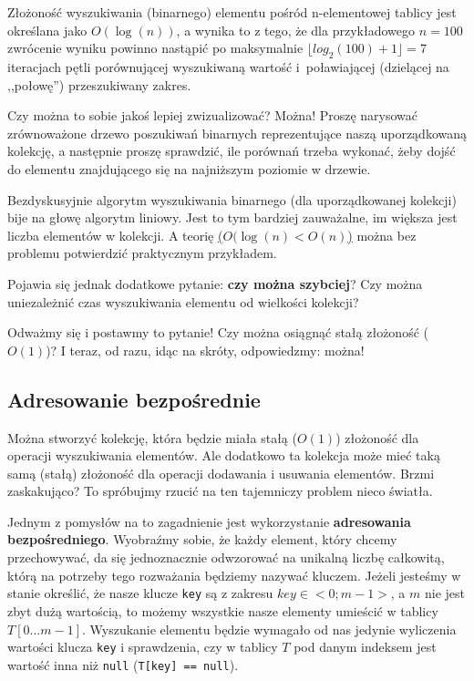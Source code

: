\documentclass[twoside]{article}
\begin{document}
Złożoność wyszukiwania (binarnego) elementu pośród n-elementowej tablicy jest określana jako
$O(\log(n))$, a wynika to z tego, że dla przykładowego $n=100$ zwrócenie wyniku powinno nastąpić
po maksymalnie $\lfloor log_2(100) + 1 \rfloor = 7$ iteracjach pętli porównującej wyszukiwaną
wartość i~poławiającej (dzielącej na ,,połowę'') przeszukiwany zakres.

Czy można to sobie jakoś lepiej zwizualizować? Można!
Proszę narysować zrównoważone drzewo poszukiwań binarnych reprezentujące naszą uporządkowaną kolekcję, a następnie proszę sprawdzić, ile porównań trzeba wykonać, żeby dojść do elementu
znajdującego się na najniższym poziomie w drzewie.

Bezdyskusyjnie algorytm wyszukiwania binarnego (dla uporządkowanej kolekcji) bije na głowę
algorytm liniowy. Jest to tym bardziej zauważalne, im większa jest liczba elementów w kolekcji.
A teorię \underline{($O(\log (n) < O(n)$)} można bez problemu potwierdzić praktycznym przykładem.

Pojawia się jednak dodatkowe pytanie: \textbf{czy można szybciej}?
Czy można uniezależnić czas wyszukiwania elementu od wielkości kolekcji?

Odważmy się i postawmy to pytanie! Czy można osiągnąć stałą złożoność ($O(1)$)?
I teraz, od razu, idąc na skróty, odpowiedzmy: można!

\subsection{Adresowanie bezpośrednie}
Można stworzyć kolekcję, która będzie miała stałą ($O(1)$) złożoność dla operacji wyszukiwania
elementów.
Ale dodatkowo ta kolekcja może mieć taką samą (stałą) złożoność dla operacji dodawania i usuwania
elementów.
Brzmi zaskakująco? To spróbujmy rzucić na ten tajemniczy problem nieco światła.

Jednym z pomysłów na to zagadnienie jest wykorzystanie \textbf{adresowania bezpośredniego}.
Wyobraźmy sobie, że każdy element, który chcemy przechowywać, da się jednoznacznie odwzorować na unikalną liczbę całkowitą, którą na potrzeby tego rozważania będziemy nazywać kluczem.
Jeżeli jesteśmy w stanie określić, że nasze klucze \verb|key| są z zakresu $key \in <0; m-1>$, 
a $m$ nie jest zbyt dużą wartością, to możemy wszystkie nasze elementy umieścić w tablicy
$T[0... m-1]$.
Wyszukanie elementu będzie wymagało od nas jedynie wyliczenia wartości klucza \verb|key| i sprawdzenia, czy w tablicy $T$ pod danym indeksem jest wartość inna niż \verb|null| 
(\verb|T[key] == null|).
\end{document}
